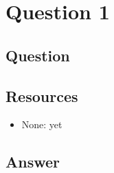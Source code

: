 \section{Question 1}

\subsection{Question}


\subsection{Resources}
\begin{itemize}
\item None: yet
\end{itemize}

\subsection{Answer}
